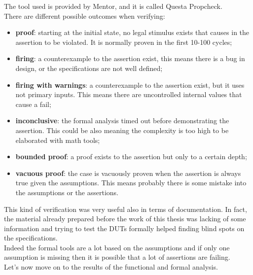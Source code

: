 The tool used is provided by Mentor, and it is called Questa Propcheck.\\
There are different possible outcomes when verifying:
\begin{itemize}
    \item \textbf{proof}: starting at the initial state, no legal stimulus exists that causes in the assertion to be violated. It is normally proven in the first 10-100 cycles;
    
    \item \textbf{firing}: a counterexample to the assertion exist, this means there is a bug in design, or the specifications are not well defined;
    
    \item \textbf{firing with warnings}: a counterexample to the assertion exist, but it uses not primary inputs. This means there are uncontrolled internal values that cause a fail;
    
    \item \textbf{inconclusive}: the formal analysis timed out before demonstrating the assertion. This could be also meaning the complexity is too high to be elaborated with math tools; 
    
    \item \textbf{bounded proof}: a proof exists to the assertion but only to a certain depth;
    
    \item \textbf{vacuous proof}: the case is vacuously proven when the assertion is always true given the assumptions. This means probably there is some mistake into the assumptions or the assertions.
\end{itemize}


This kind of verification was very useful also in terms of documentation. In fact, the material already prepared before the work of this thesis was lacking of some information and trying to test the DUTs formally helped finding blind spots on the specifications.\\
Indeed the formal tools are a lot based on the assumptions and if only one assumption is missing then it is possible that a lot of assertions are failing.\\

Let's now move on to the results of the functional and formal analysis.
